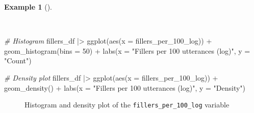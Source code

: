 \documentclass[
  letterpaper,
  DIV=11,
  numbers=noendperiod]{scrreprt}
\newenvironment{Shaded}{\begin{snugshade}}{\end{snugshade}}
\newcommand{\AttributeTok}[1]{\textcolor[rgb]{0.00,0.00,0.00}{#1}}
\newcommand{\CommentTok}[1]{\textcolor[rgb]{0.00,0.00,0.00}{\textit{#1}}}
\newcommand{\DecValTok}[1]{\textcolor[rgb]{0.00,0.00,0.00}{#1}}
\newcommand{\FunctionTok}[1]{\textcolor[rgb]{0.00,0.00,0.00}{#1}}
\newcommand{\NormalTok}[1]{\textcolor[rgb]{0.00,0.00,0.00}{#1}}
\newcommand{\SpecialCharTok}[1]{\textcolor[rgb]{0.00,0.00,0.00}{#1}}
\newcommand{\StringTok}[1]{\textcolor[rgb]{0.00,0.00,0.00}{#1}}
\theoremstyle{definition}
\newtheorem{example}{Example}[chapter]
\theoremstyle{remark}
\begin{document}
\begin{example}[]\protect\hypertarget{exm-ida-num-uni-log-plot}{}\label{exm-ida-num-uni-log-plot}

~

\begin{Shaded}
\begin{Highlighting}[]
\CommentTok{\# Histogram}
\NormalTok{fillers\_df }\SpecialCharTok{|\textgreater{}}
  \FunctionTok{ggplot}\NormalTok{(}\FunctionTok{aes}\NormalTok{(}\AttributeTok{x =}\NormalTok{ fillers\_per\_100\_log)) }\SpecialCharTok{+}
  \FunctionTok{geom\_histogram}\NormalTok{(}\AttributeTok{bins =} \DecValTok{50}\NormalTok{) }\SpecialCharTok{+}
  \FunctionTok{labs}\NormalTok{(}\AttributeTok{x =} \StringTok{"Fillers per 100 utterances (log)"}\NormalTok{, }\AttributeTok{y =} \StringTok{"Count"}\NormalTok{)}

\CommentTok{\# Density plot}
\NormalTok{fillers\_df }\SpecialCharTok{|\textgreater{}}
  \FunctionTok{ggplot}\NormalTok{(}\FunctionTok{aes}\NormalTok{(}\AttributeTok{x =}\NormalTok{ fillers\_per\_100\_log)) }\SpecialCharTok{+}
  \FunctionTok{geom\_density}\NormalTok{() }\SpecialCharTok{+}
  \FunctionTok{labs}\NormalTok{(}\AttributeTok{x =} \StringTok{"Fillers per 100 utterances (log)"}\NormalTok{, }\AttributeTok{y =} \StringTok{"Density"}\NormalTok{)}
\end{Highlighting}
\end{Shaded}

\begin{figure}[H]

\begin{minipage}{0.50\linewidth}



\end{minipage}%
%
\begin{minipage}{0.50\linewidth}



\end{minipage}%

\caption{\label{fig-ida-num-uni-log-plot}Histogram and density plot of
the \texttt{fillers\_per\_100\_log} variable}

\end{figure}%

\end{example}
\end{document}

